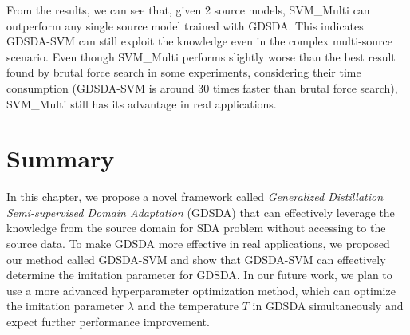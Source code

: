From the results, we can see that, given 2 source models, SVM\_Multi can outperform any single source model trained with GDSDA. This indicates GDSDA-SVM can still exploit the knowledge even in the complex multi-source scenario. Even though SVM\_Multi performs slightly worse than the best result found by brutal force search in some experiments, considering their time consumption (GDSDA-SVM is around 30 times faster than brutal force search), SVM\_Multi still has its advantage in real applications.

\section{Summary}\label{sec:aaai:con}
In this chapter, we propose a novel framework called \textit{Generalized Distillation Semi-supervised Domain Adaptation} (GDSDA) that can effectively leverage the knowledge from the source domain for SDA problem without accessing to the source data. 
To make GDSDA more effective in real applications, we proposed our method called GDSDA-SVM and show that GDSDA-SVM can effectively determine the imitation parameter for GDSDA. 
In our future work, we plan to use a more advanced hyperparameter optimization method, which can optimize the imitation parameter $\lambda$ and the temperature $T$ in GDSDA simultaneously and expect
further performance improvement. 